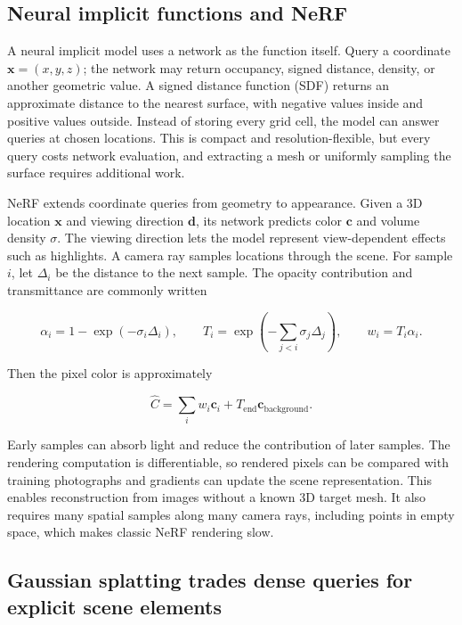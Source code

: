 \subsection{Neural implicit functions and NeRF}\label{04-visual-computing-ii-ch034-neural-implicit-functions-and-nerf}

A neural implicit model uses a network as the function itself. Query a coordinate \(\mathbf{x}=(x,y,z)\); the network may return occupancy, signed distance, density, or another geometric value. A signed distance function (SDF) returns an approximate distance to the nearest surface, with negative values inside and positive values outside. Instead of storing every grid cell, the model can answer queries at chosen locations. This is compact and resolution-flexible, but every query costs network evaluation, and extracting a mesh or uniformly sampling the surface requires additional work.

NeRF extends coordinate queries from geometry to appearance. Given a 3D location \(\mathbf{x}\) and viewing direction \(\mathbf{d}\), its network predicts color \(\mathbf{c}\) and volume density \(\sigma\). The viewing direction lets the model represent view-dependent effects such as highlights. A camera ray samples locations through the scene. For sample \(i\), let \(\Delta_i\) be the distance to the next sample. The opacity contribution and transmittance are commonly written

\[
\alpha_i=1-\exp(-\sigma_i\Delta_i),\qquad
T_i=\exp\left(-\sum_{j<i}\sigma_j\Delta_j\right),\qquad
w_i=T_i\alpha_i.
\]

Then the pixel color is approximately

\[
\hat{C}=\sum_i w_i\mathbf{c}_i+T_{\text{end}}\mathbf{c}_{\text{background}}.
\]

Early samples can absorb light and reduce the contribution of later samples. The rendering computation is differentiable, so rendered pixels can be compared with training photographs and gradients can update the scene representation. This enables reconstruction from images without a known 3D target mesh. It also requires many spatial samples along many camera rays, including points in empty space, which makes classic NeRF rendering slow.

\subsection{Gaussian splatting trades dense queries for explicit scene elements}\label{04-visual-computing-ii-ch034-gaussian-splatting-trades-dense-queries-for-explicit-scene-elements}

